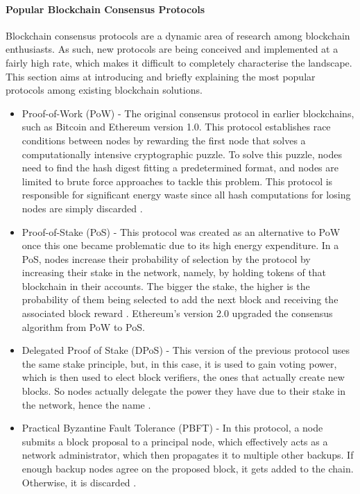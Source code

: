 \documentclass[../access.tex]{subfiles}
\begin{document}
        \paragraph{Popular Blockchain Consensus Protocols}
        \label{blockchain-consensus-protocols}
            Blockchain consensus protocols are a dynamic area of research among blockchain enthusiasts. As such, new protocols are being conceived and implemented at a fairly high rate, which makes it difficult to completely characterise the landscape. This section aims at introducing and briefly explaining the most popular protocols among existing blockchain solutions.
                \begin{itemize}
                    \item {Proof-of-Work (PoW) - The original consensus protocol in earlier blockchains, such as Bitcoin and Ethereum version 1.0. This protocol establishes race conditions between nodes by rewarding the first node that solves a computationally intensive cryptographic puzzle. To solve this puzzle, nodes need to find the hash digest fitting a predetermined format, and nodes are limited to brute force approaches to tackle this problem. This protocol is responsible for significant energy waste since all hash computations for losing nodes are simply discarded \cite{Narayanan2016}.}

                    \item {Proof-of-Stake (PoS) - This protocol was created as an alternative to PoW once this one became problematic due to its high energy expenditure. In a PoS, nodes increase their probability of selection by the protocol by increasing their stake in the network, namely, by holding tokens of that blockchain in their accounts. The bigger the stake, the higher is the probability of them being selected to add the next block and receiving the associated block reward \cite{Bouraga2021}. Ethereum's version 2.0 upgraded the consensus algorithm from PoW to PoS.}

                    \item {Delegated Proof of Stake (DPoS) - This version of the previous protocol uses the same stake principle, but, in this case, it is used to gain voting power, which is then used to elect block verifiers, the ones that actually create new blocks. So nodes actually delegate the power they have due to their stake in the network, hence the name \cite{Zhang2020a}.}

                    \item {Practical Byzantine Fault Tolerance (PBFT)} - In this protocol, a node submits a block proposal to a principal node, which effectively acts as a network administrator, which then propagates it to multiple other backups. If enough backup nodes agree on the proposed block, it gets added to the chain. Otherwise, it is discarded \cite{Xiao2020}.
                \end{itemize}
            
\end{document}
